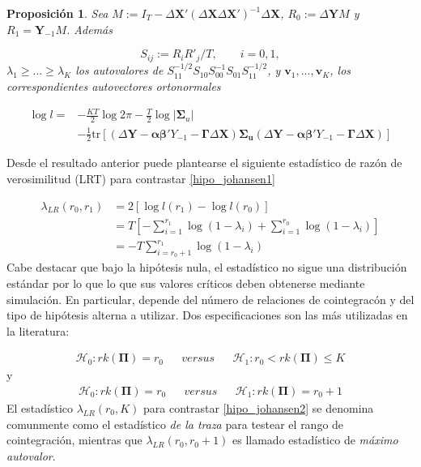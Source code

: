 \documentclass[12pt, twoside]{book}\usepackage[]{graphicx}\usepackage[]{color}
\let\bf\mathbf
\numberwithin{equation}{section}
\numberwithin{theorem}{section}
\newtheorem{teorema}{Proposición}
\newenvironment{teo}
      {\begin{shaded}\begin{teorema}}
      {\end{teorema}\end{shaded}}
\numberwithin{teorema}{section}
\numberwithin{defi}{section}
\numberwithin{prop}{section}
\numberwithin{defi}{section}
\theoremstyle{plain}
\begin{document}
\begin{teo}
Sea $M:=I_{T}-\Delta \bf{X}'(\Delta \bf{X}\Delta \bf{X}')^{-1}\Delta \bf{X}$, $R_{0}:=\Delta \bf{Y}M$ y $R_{1}=\bf{Y}_{-1}M$. Además 

\begin{equation}
S_{ij}:=R_{i}R'_{j}/T, \qquad i=0,1, 
\end{equation}
$\lambda_{1}\geq ... \geq \lambda_{K}$ los autovalores de $S_{11}^{-1/2}S_{10}S_{00}^{-1}S_{01}S_{11}^{-1/2}$, y $\bf{v}_{1},...,\bf{v}_{K}$, los correspondientes autovectores ortonormales 

\begin{align}
\log l  =  & -\frac{KT}{2}\log 2\pi-\frac{T}{2}\log |\mathbf{\Sigma}_{u}|  \nonumber \\ 
  & -\frac{1}{2}\text{tr}\left[(\Delta \bf{Y}-\boldsymbol{\alpha}\boldsymbol{\beta}'Y_{-1}-\mathbf{\Gamma}\Delta\bf{X})\mathbf{\Sigma_{u}}(\Delta \bf{Y}-\boldsymbol{\alpha}\boldsymbol{\beta}'Y_{-1}-\mathbf{\Gamma}\Delta\bf{X})\right] 
\end{align}
\end{teo}

Desde el resultado anterior puede plantearse el siguiente estadístico de razón de verosimilitud (LRT) para contrastar \eqref{hipo_johansen1}

\begin{align}
\lambda_{LR}(r_{0},r_{1}) & = 2[\log l(r_{1})-\log l(r_{0})] \nonumber \\ 
                          & = T\left[-\sum_{i=1}^{r_{1}}\log(1-\lambda_{i})+\sum_{i=1}^{r_{0}}\log(1-\lambda_{i})\right] \nonumber \\ 
                          & = -T\sum_{i=r_{0}+1}^{r_{1}}\log (1-\lambda_{i})
\end{align}
Cabe destacar que bajo la hipótesis nula, el estadístico no sigue una distribución estándar por lo que lo que sus valores críticos deben obtenerse mediante simulación. En particular, depende del número de relaciones de cointegracón y del tipo de hipótesis alterna a utilizar. Dos especificaciones son las más utilizadas en la literatura: 

\begin{align}\label{hipo_johansen2}
\mathcal{H}_{0}: rk(\boldsymbol{\Pi})=r_{0} &&  versus && \mathcal{H}_{1}: r_{0}<rk(\boldsymbol{\Pi})\leq K 
\end{align}
y
\begin{align}\label{hipo_johansen3}
\mathcal{H}_{0}: rk(\mathbf{\Pi})=r_{0} &&  versus && \mathcal{H}_{1}: rk(\mathbf{\Pi})=r_{0}+1 
\end{align}
El estadístico $\lambda_{LR}(r_{0},K)$ para contrastar \eqref{hipo_johansen2} se denomina comunmente como el estadístico \textit{de la traza} para testear el rango de cointegración, mientras que $\lambda_{LR}(r_{0},r_{0}+1)$ es llamado estadístico de \textit{máximo autovalor}.  
\end{document}
